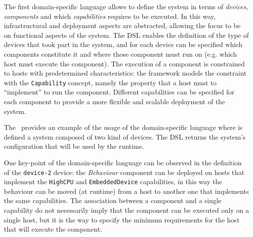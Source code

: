 \documentclass[conference]{IEEEtran}
\begin{document}
The first domain-specific language allows to define the system in terms of
\emph{devices}, \emph{components} and which \emph{capabilities} requires to be executed.
%
In this way, infrastructural and deployment aspects are abstracted, allowing the focus to be on functional aspects of the system.
%
The DSL enables the definition of the type of devices that took part in the system,
and for each device can be specified which components constitute it and where those component must run on (e.g. which host must execute the component).
%
The execution of a component is constrained to hosts with predetermined characteristics:
the framework models the constraint with the \texttt{Capability} concept,
namely the property that a host must to ``implement'' to run the component.
%
Different capabilities can be specified for each component to provide a more flexible and scalable deployment of the system.

The~ provides an example of the usage of the domain-specific language where is defined a system composed of two kind of devices.
%
The DSL returns the system's configuration that will be used by the runtime.

One key-point of the domain-specific language can be observed in the definition of the \texttt{device-2} device:
the \emph{Behaviour} component can be deployed on hosts that implement the \texttt{HighCPU} and \texttt{EmbeddedDevice} capabilities,
in this way the behaviour can be moved (at runtime) from a host to another one that implements the same capabilities.
%
The association between a component and a single capability do not necessarily imply that the component can be executed only on a single host,
but it is the way to specify the minimum requirements for the host that will execute the component.


\end{document}
